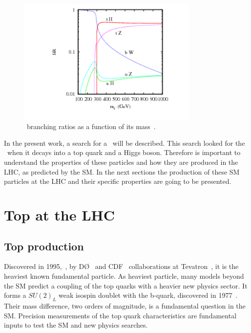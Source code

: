 \begin{figure}[!Hhtbp]
  \begin{center}
    \includegraphics[width=0.8\textwidth]{figs/pheno_br_tp.png}
    \caption{\Tp~branching ratios as a function of its mass~\cite{Cacciapaglia:2011fx}.}
    \label{fig:TBRs}
  \end{center}
\end{figure}

In the present work, a search for a \Tp~will be described. This search looked for the \Tp~when it decays into a top quark and a Higgs boson. Therefore is important to understand the properties of these particles and how they are produced in the LHC, as predicted by the SM. In the next sections the production of these SM particles at the LHC and their specific properties are going to be presented. %

\section{Top at the LHC}
\subsection{Top production}

Discovered in 1995,~\cite{Abe:1995hr, Abachi:1995iq}, by D\O~\cite{Abazov:2002su} and CDF~\cite{Blair:1996kx} collaborations at Tevatron~\cite{Group:1984bk}, it is the heaviest known fundamental particle. As heaviest particle, many models beyond the SM predict a coupling of the top quarks with a heavier new physics sector. It forms a $SU(2)_{L}$ weak isospin doublet with the b-quark, discovered in 1977~\cite{Herb:1977ek}. Their mass difference, two orders of magnitude, is a fundamental question in the SM. Precision measurements of the top quark characteristics are fundamental inputs to test the SM and new physics searches.

